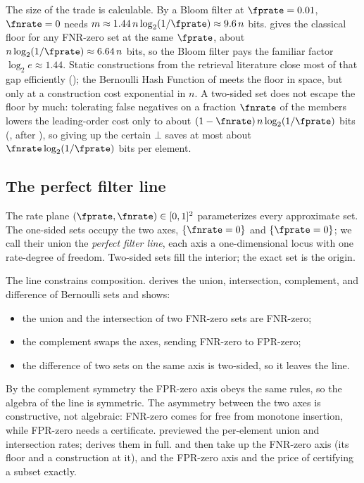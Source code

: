 The size of the trade is calculable. By  a Bloom
filter at $\fprate = 0.01$, $\fnrate = 0$ needs $m \approx 1.44\,n
\log_2(1/\fprate) \approx 9.6\,n$ bits.
 gives the classical floor for any FNR-zero set
at the same $\fprate$, about $n\log_2(1/\fprate) \approx 6.64\,n$ bits, so
the Bloom filter pays the familiar factor $\log_2 e \approx 1.44$. Static
constructions from the retrieval literature close most of that gap
efficiently (); the Bernoulli Hash Function of
 meets the floor in space, but only at a
construction cost exponential in $n$. A two-sided set
does not escape the floor by much: tolerating false negatives on a fraction
$\fnrate$ of the members lowers the leading-order cost only to about
$(1 - \fnrate)\,n\log_2(1/\fprate)$ bits (, after
\textcite{pagh-rodler-2001}), so giving up the certain $\bot$ saves at most
about $\fnrate \log_2(1/\fprate)$ bits per element.

\subsection*{The perfect filter line}

The rate plane $(\fprate, \fnrate) \in [0,1]^2$ parameterizes every
approximate set. The one-sided sets occupy the two axes, $\{\fnrate = 0\}$
and $\{\fprate = 0\}$; we call their union the \emph{perfect filter
line},
each axis a one-dimensional locus with one rate-degree of freedom. Two-sided
sets fill the interior; the exact set is the origin.

The line constrains composition.  derives the
union, intersection, complement, and difference of Bernoulli sets and shows:
\begin{itemize}
  \item the union and the intersection of two FNR-zero sets are FNR-zero;
  \item the complement swaps the axes, sending FNR-zero to FPR-zero;
  \item the difference of two sets on the same axis is two-sided, so it
    leaves the line.
\end{itemize}
By the complement symmetry the FPR-zero axis obeys the same rules, so the
algebra of the line is symmetric. The asymmetry between the two axes is
constructive, not algebraic: FNR-zero comes for free from monotone insertion,
while FPR-zero needs a certificate.  previewed the
per-element union and intersection rates;  derives
them in full.  and
 then take up the FNR-zero axis (its floor
and a construction at it), and  the FPR-zero
axis and the price of certifying a subset exactly.
